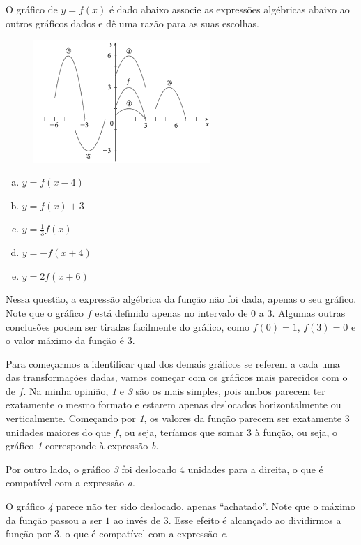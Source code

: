\documentclass[main.tex]{subfiles}
\begin{document}
\begin{resolvida}
O gráfico de $y=f(x)$ é dado abaixo associe as expressões algébricas abaixo ao outros gráficos dados e dê uma razão para as suas escolhas.

\begin{figure}[h]
\centering
\includegraphics[width=0.6\textwidth]{./img/c7r1.png}
\end{figure}

\begin{enumerate}[a)]
\item $y=f(x-4)$
\item $y=f(x)+3$
\item $y= \frac{1}{3}f(x)$
\item $y=-f(x+4)$
\item $y=2f(x+6)$
\end{enumerate}
\end{resolvida}

Nessa questão, a expressão algébrica da função não foi dada, apenas o seu gráfico. Note que o gráfico $f$ está definido apenas no intervalo de $0$ a $3$. Algumas outras conclusões podem ser tiradas facilmente do gráfico, como $f(0)=1$, $f(3)=0$ e o valor máximo da função é $3$.

Para começarmos a identificar qual dos demais gráficos se referem a cada uma das transformações dadas, vamos começar com os gráficos mais parecidos com o de $f$. Na minha opinião, \textit{1} e \textit{3} são os mais simples, pois ambos parecem ter exatamente o mesmo formato e estarem apenas deslocados horizontalmente ou verticalmente. Começando por \textit{1}, os valores da função parecem ser exatamente $3$ unidades maiores do que $f$, ou seja, teríamos que somar $3$ à função, ou seja, o gráfico \textit{1} corresponde à expressão \textit{b}.

Por outro lado, o gráfico \textit{3} foi deslocado $4$ unidades para a direita, o que é compatível com a expressão \textit{a}.

O gráfico \textit{4} parece não ter sido deslocado, apenas ``achatado''. Note que o máximo da função passou a ser $1$ ao invés de $3$. Esse efeito é alcançado ao dividirmos a função por $3$, o que é compatível com a expressão \textit{c}.
\end{document}
